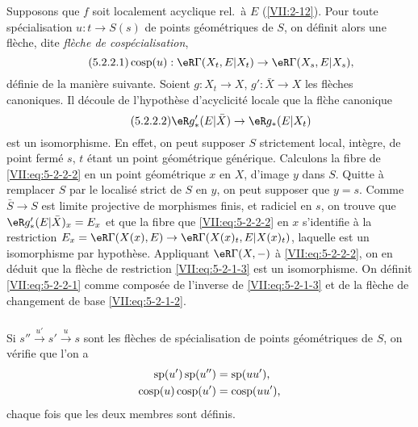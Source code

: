 Supposons que $f$ soit localement acyclique rel.\ \`a $E$ (\ref{VII:2-12}). 
Pour toute sp\'ecialisation $u:t\to S(s)$ de points g\'eom\'etriques de $S$, on 
d\'efinit alors une fl\`eche, dite \emph{fl\`eche de cosp\'ecialisation}, 
\begin{equation*}\tag{5.2.2.1}\label{VII:eq:5-2-2-1}
  \cosp(u):\eR\Gamma(X_t,E|X_t) \to \eR\Gamma(X_s,E|X_s) \text{,} 
\end{equation*}
d\'efinie de la mani\`ere suivante. Soient $g:X_t\to X$, $g':\bar X\to X$ les 
fl\`eches canoniques. Il d\'ecoule de l'hypoth\`ese d'acyclicit\'e locale que 
la fl\`che canonique 
\begin{equation*}\tag{5.2.2.2}\label{VII:eq:5-2-2-2}
  \eR g_\ast'(E|\bar X)\to \eR g_\ast(E|X_t) 
\end{equation*}
est un isomorphisme. En effet, on peut supposer $S$ strictement local, 
int\`egre, de point ferm\'e $s$, $t$ \'etant un point g\'eom\'etrique 
g\'en\'erique. Calculons la fibre de \eqref{VII:eq:5-2-2-2} en un point 
g\'eom\'etrique $x$ en $X$, d'image $y$ dans $S$. Quitte \`a remplacer $S$ par 
le localis\'e strict de $S$ en $y$, on peut supposer que $y=s$. Comme 
$\bar S\to S$ est limite projective de morphismes finis, et radiciel en $s$, on 
trouve que $\eR g_\ast'(E|\bar X)_x = E_x$ et que la fibre que 
\eqref{VII:eq:5-2-2-2} en $x$ s'identifie \`a la restriction 
$E_x=\eR\Gamma(X(x),E)\to \eR\Gamma(X(x)_t,E|X(x)_t)$, laquelle est un 
isomorphisme par hypoth\`ese. Appliquant $\eR\Gamma(X,-)$ \`a 
\eqref{VII:eq:5-2-2-2}, on en d\'eduit que la fl\`eche de restriction 
\eqref{VII:eq:5-2-1-3} est un isomorphisme. On d\'efinit \eqref{VII:eq:5-2-2-1} 
comme compos\'ee de l'inverse de \eqref{VII:eq:5-2-1-3} et de la fl\`eche de 
changement de base \eqref{VII:eq:5-2-1-2}. 





\subsubsection{}\label{VII:5-2-3}

Si $s'' \xrightarrow{u'} s' \xrightarrow u s$ sont les fl\`eches de 
sp\'ecialisation de points g\'eom\'etriques de $S$, on v\'erifie que l'on a 
\begin{align*}
  \operatorname{sp}(u')\operatorname{sp}(u'') &= \operatorname{sp}(u u') \text{,} \\
  \operatorname{cosp}(u) \operatorname{cosp}(u') &= \operatorname{cosp}(u u') \text{,} 
\end{align*}
chaque fois que les deux membres sont d\'efinis. 





